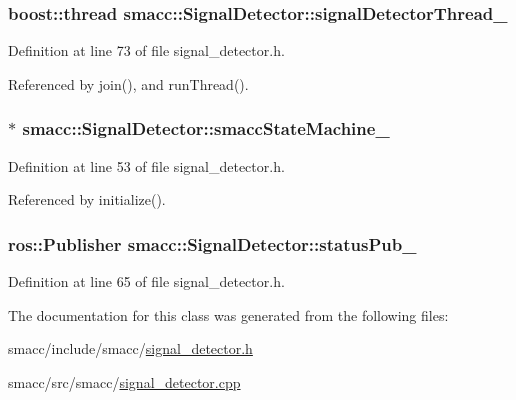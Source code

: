 \subsubsection[{\texorpdfstring{signal\+Detector\+Thread\+\_\+}{signalDetectorThread_}}]{\setlength{\rightskip}{0pt plus 5cm}boost\+::thread smacc\+::\+Signal\+Detector\+::signal\+Detector\+Thread\+\_\+\hspace{0.3cm}{\ttfamily [private]}}\hypertarget{classsmacc_1_1SignalDetector_a4346a400cd37eafc5d1d2e63d975785e}{}\label{classsmacc_1_1SignalDetector_a4346a400cd37eafc5d1d2e63d975785e}


Definition at line 73 of file signal\+\_\+detector.\+h.



Referenced by join(), and run\+Thread().

\subsubsection[{\texorpdfstring{smacc\+State\+Machine\+\_\+}{smaccStateMachine_}}]{$\ast$ smacc\+::\+Signal\+Detector\+::smacc\+State\+Machine\+\_\+\hspace{0.3cm}{\ttfamily [private]}}\hypertarget{classsmacc_1_1SignalDetector_a46025de6ac7b5980e22144f9703236a4}{}\label{classsmacc_1_1SignalDetector_a46025de6ac7b5980e22144f9703236a4}


Definition at line 53 of file signal\+\_\+detector.\+h.



Referenced by initialize().

\subsubsection[{\texorpdfstring{status\+Pub\+\_\+}{statusPub_}}]{\setlength{\rightskip}{0pt plus 5cm}ros\+::\+Publisher smacc\+::\+Signal\+Detector\+::status\+Pub\+\_\+\hspace{0.3cm}{\ttfamily [private]}}\hypertarget{classsmacc_1_1SignalDetector_ae065bbd4e699e5fce00fbc508dedd4c1}{}\label{classsmacc_1_1SignalDetector_ae065bbd4e699e5fce00fbc508dedd4c1}


Definition at line 65 of file signal\+\_\+detector.\+h.



The documentation for this class was generated from the following files\+:\begin{DoxyCompactItemize}
\item 
smacc/include/smacc/\hyperlink{signal__detector_8h}{signal\+\_\+detector.\+h}\item 
smacc/src/smacc/\hyperlink{signal__detector_8cpp}{signal\+\_\+detector.\+cpp}\end{DoxyCompactItemize}
